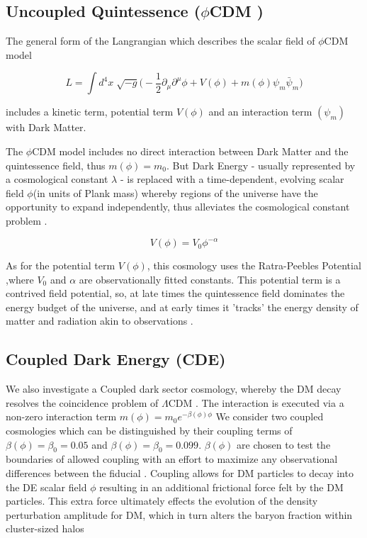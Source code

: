 \documentclass[a4paper,fleqn,usenatbib]{mnras}
\def \lcdm{$\Lambda$CDM }
\def \qcdm{$\phi$CDM }
\begin{document}
\subsection{Uncoupled Quintessence (\qcdm)}\label{quint}
The general form of the Langrangian which describes the scalar field of \qcdm model
\begin{ceqn}
\begin{equation}
L=\int d^{4}x\sqrt[]{-g}\big(-\frac{1}{2}\partial_{\mu}\partial^{\mu}\phi+V(\phi)+m(\phi)\psi_{m}\bar{\psi}_{m}\big)
\end{equation}
\end{ceqn}
includes a kinetic term, potential term $V(\phi)$ and an interaction term $(\psi_{m})$ with Dark Matter.

The \qcdm model includes no direct interaction between Dark Matter and the quintessence field, thus $m(\phi)=m_{0}$. But Dark Energy - usually represented by a cosmological constant $\lambda$ - is replaced with a time-dependent, evolving scalar field $\phi$(in units of Plank mass) whereby regions of the universe have the opportunity to expand independently, thus alleviates the cosmological constant problem \citep{Joyce_15}.
\begin{ceqn}
\begin{equation}
V(\phi)=V_{0}\phi^{-\alpha}\label{rp}
\end{equation}
\end{ceqn}
As for the potential term $V(\phi)$, this cosmology uses the Ratra-Peebles Potential  \citep{Ratra_88},where $V_{0}$ and $\alpha$ are observationally fitted constants. This potential term is a contrived field potential, so, at late times the quintessence field dominates the energy budget of the universe, and at early times it 'tracks' the energy density of matter and radiation akin to observations \citep{Joyce_15}.

\subsection{Coupled Dark Energy (CDE)}\label{cde}
We also investigate a Coupled dark sector cosmology, whereby the DM decay resolves the coincidence problem of \lcdm. The interaction is executed via a non-zero interaction term $m(\phi)=m_{0}e^{-\beta(\phi)\phi}$ We consider two coupled cosmologies which can be distinguished by their coupling terms of $\beta(\phi)=\beta_{0}=0.05$ and $\beta(\phi)=\beta_{0}=0.099$. $\beta(\phi)$ are chosen to test the boundaries of allowed coupling with an effort to maximize any observational differences between the fiducial \citep{Pettorino_12}. Coupling allows for DM particles to decay into the DE scalar field $\phi$ resulting in an additional frictional force felt by the DM particles. This extra force ultimately effects the evolution of the density perturbation amplitude for DM, which in turn alters the baryon fraction within cluster-sized halos \citep{Baldi_10} 
\end{document}
